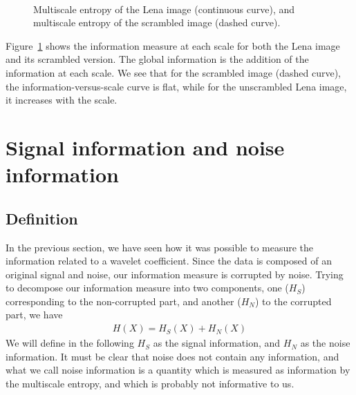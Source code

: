 \documentclass[11pt,a4paper]{article}
\begin{document}
\begin{figure}[htb]
\centerline{
\hbox{
}}
\caption{Multiscale entropy of the Lena image (continuous curve), 
and multiscale
entropy of the scrambled image (dashed curve).}
\label{fig_multi_memscale}
\end{figure}
Figure~\ref{fig_multi_memscale} shows the information measure at each
scale for both the Lena image and its scrambled version. The global 
information is the addition of the information at each scale. We see
that for the scrambled image (dashed curve), the 
information-versus-scale 
curve is flat, while for the unscrambled Lena image,
it increases with the scale.  

\section{Signal information and noise information}
\subsection{Definition}
In the previous section, we have seen how it was possible to measure
the information related to a wavelet coefficient. Since the data
is composed of an original signal and noise, our information measure
is corrupted by noise. Trying to decompose our information measure
into two components, one ($H_S$) corresponding to the non-corrupted part, and
another  ($H_N$) to the corrupted part, we have
\begin{eqnarray}
H(X) = H_S(X) + H_N(X)
\end{eqnarray}
We will define in the following $H_S$ as the signal information, and $H_N$
as the noise information. It must be clear that noise does not 
contain any information, and what we call noise information is a quantity
which is measured as information by the multiscale entropy, and which is 
probably not informative to us.
\end{document}
